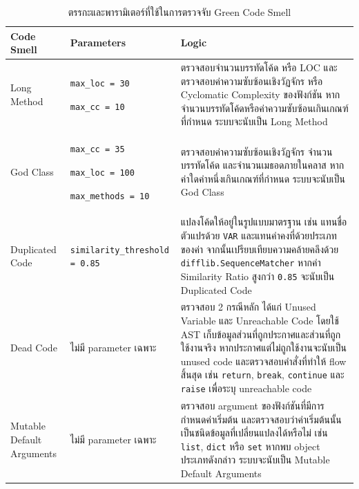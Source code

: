 \begin{table}[H]
    \centering
    \scriptsize
    \renewcommand{\arraystretch}{1.15}
    \setlength{\tabcolsep}{4pt}
    \begin{tabularx}{\textwidth}{|P{2.8cm}|P{3.6cm}|X|}
        \hline
        {\boldfont Code Smell} & {\boldfont Parameters} & {\boldfont Logic} \\
        \hline

        Long Method &
        \texttt{max\_loc = 30}

        \texttt{max\_cc = 10}
        &
        ตรวจสอบจำนวนบรรทัดโค้ด หรือ LOC และตรวจสอบค่าความซับซ้อนเชิงวัฏจักร หรือ Cyclomatic Complexity ของฟังก์ชัน หากจำนวนบรรทัดโค้ดหรือค่าความซับซ้อนเกินเกณฑ์ที่กำหนด ระบบจะนับเป็น Long Method \cite{refactoringGuruLongMethod,guru99CyclomaticComplexity}
        \\
        \hline

        God Class &
        \texttt{max\_cc = 35}

        \texttt{max\_loc = 100}

        \texttt{max\_methods = 10}
        &
        ตรวจสอบค่าความซับซ้อนเชิงวัฏจักร จำนวนบรรทัดโค้ด และจำนวนเมธอดภายในคลาส หากค่าใดค่าหนึ่งเกินเกณฑ์ที่กำหนด ระบบจะนับเป็น God Class \cite{refactoringGuruLargeClass,radonCyclomaticComplexity}
        \\
        \hline

        Duplicated Code &
        \texttt{similarity\_threshold = 0.85}
        &
        แปลงโค้ดให้อยู่ในรูปแบบมาตรฐาน เช่น แทนชื่อตัวแปรด้วย \texttt{VAR} และแทนค่าคงที่ด้วยประเภทของค่า จากนั้นเปรียบเทียบความคล้ายคลึงด้วย \texttt{difflib.SequenceMatcher} หากค่า Similarity Ratio สูงกว่า \texttt{0.85} จะนับเป็น Duplicated Code \cite{pythonDifflib,pylintDuplicateCode,refactoringGuruDuplicateCode}
        \\
        \hline

        Dead Code &
        ไม่มี parameter เฉพาะ
        &
        ตรวจสอบ 2 กรณีหลัก ได้แก่ Unused Variable และ Unreachable Code โดยใช้ AST เก็บข้อมูลส่วนที่ถูกประกาศและส่วนที่ถูกใช้งานจริง หากประกาศแต่ไม่ถูกใช้งานจะนับเป็น unused code และตรวจสอบคำสั่งที่ทำให้ flow สิ้นสุด เช่น \texttt{return}, \texttt{break}, \texttt{continue} และ \texttt{raise} เพื่อระบุ unreachable code \cite{pylintUnreachable,pylintPossiblyUnusedVariable,vultureDeadCode,refactoringGuruDeadCode}
        \\
        \hline

        Mutable Default Arguments &
        ไม่มี parameter เฉพาะ
        &
        ตรวจสอบ argument ของฟังก์ชันที่มีการกำหนดค่าเริ่มต้น และตรวจสอบว่าค่าเริ่มต้นนั้นเป็นชนิดข้อมูลที่เปลี่ยนแปลงได้หรือไม่ เช่น \texttt{list}, \texttt{dict} หรือ \texttt{set} หากพบ object ประเภทดังกล่าว ระบบจะนับเป็น Mutable Default Arguments \cite{pylintDangerousDefaultValue,sonarMutableDefaultArgument}
        \\
        \hline

    \end{tabularx}
\captionsetup{justification=centering, name=ตาราง}
\caption{ตรรกะและพารามิเตอร์ที่ใช้ในการตรวจจับ Green Code Smell}
\label{table:ch4_detection_logic}
\end{table}

